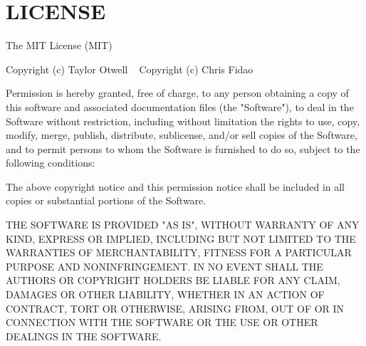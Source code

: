 \chapter{LICENSE}
\hypertarget{md_vendor_2laravel_2sail_2_l_i_c_e_n_s_e}{}\label{md_vendor_2laravel_2sail_2_l_i_c_e_n_s_e}
The MIT License (MIT)

Copyright (c) Taylor Otwell ~\newline
 Copyright (c) Chris Fidao

Permission is hereby granted, free of charge, to any person obtaining a copy of this software and associated documentation files (the "{}\+Software"{}), to deal in the Software without restriction, including without limitation the rights to use, copy, modify, merge, publish, distribute, sublicense, and/or sell copies of the Software, and to permit persons to whom the Software is furnished to do so, subject to the following conditions\+:

The above copyright notice and this permission notice shall be included in all copies or substantial portions of the Software.

THE SOFTWARE IS PROVIDED "{}\+AS IS"{}, WITHOUT WARRANTY OF ANY KIND, EXPRESS OR IMPLIED, INCLUDING BUT NOT LIMITED TO THE WARRANTIES OF MERCHANTABILITY, FITNESS FOR A PARTICULAR PURPOSE AND NONINFRINGEMENT. IN NO EVENT SHALL THE AUTHORS OR COPYRIGHT HOLDERS BE LIABLE FOR ANY CLAIM, DAMAGES OR OTHER LIABILITY, WHETHER IN AN ACTION OF CONTRACT, TORT OR OTHERWISE, ARISING FROM, OUT OF OR IN CONNECTION WITH THE SOFTWARE OR THE USE OR OTHER DEALINGS IN THE SOFTWARE. 